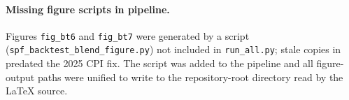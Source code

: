 \paragraph{Missing figure scripts in pipeline.}
Figures \texttt{fig\_bt6} and \texttt{fig\_bt7} were generated by a script
(\texttt{spf\_backtest\_blend\_figure.py}) not included in \texttt{run\_all.py}; stale
copies in \texttt{} predated the 2025 CPI fix.  The script was added to the
pipeline and all figure-output paths were unified to write to the repository-root
\texttt{} directory read by the \LaTeX{} source.


